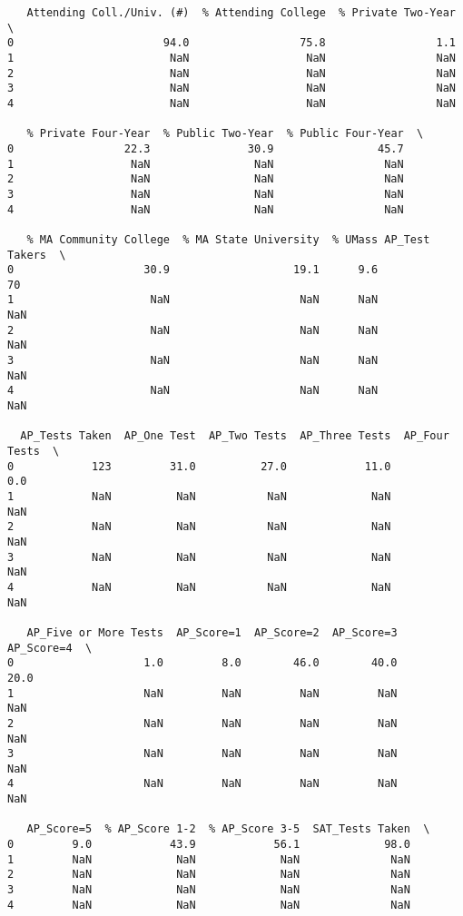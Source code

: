 \documentclass[11pt]{article}
\begin{document}
\begin{verbatim}
   Attending Coll./Univ. (#)  % Attending College  % Private Two-Year  \
0                       94.0                 75.8                 1.1   
1                        NaN                  NaN                 NaN   
2                        NaN                  NaN                 NaN   
3                        NaN                  NaN                 NaN   
4                        NaN                  NaN                 NaN   

   % Private Four-Year  % Public Two-Year  % Public Four-Year  \
0                 22.3               30.9                45.7   
1                  NaN                NaN                 NaN   
2                  NaN                NaN                 NaN   
3                  NaN                NaN                 NaN   
4                  NaN                NaN                 NaN   

   % MA Community College  % MA State University  % UMass AP_Test Takers  \
0                    30.9                   19.1      9.6             70   
1                     NaN                    NaN      NaN            NaN   
2                     NaN                    NaN      NaN            NaN   
3                     NaN                    NaN      NaN            NaN   
4                     NaN                    NaN      NaN            NaN   

  AP_Tests Taken  AP_One Test  AP_Two Tests  AP_Three Tests  AP_Four Tests  \
0            123         31.0          27.0            11.0            0.0   
1            NaN          NaN           NaN             NaN            NaN   
2            NaN          NaN           NaN             NaN            NaN   
3            NaN          NaN           NaN             NaN            NaN   
4            NaN          NaN           NaN             NaN            NaN   

   AP_Five or More Tests  AP_Score=1  AP_Score=2  AP_Score=3  AP_Score=4  \
0                    1.0         8.0        46.0        40.0        20.0   
1                    NaN         NaN         NaN         NaN         NaN   
2                    NaN         NaN         NaN         NaN         NaN   
3                    NaN         NaN         NaN         NaN         NaN   
4                    NaN         NaN         NaN         NaN         NaN   

   AP_Score=5  % AP_Score 1-2  % AP_Score 3-5  SAT_Tests Taken  \
0         9.0            43.9            56.1             98.0   
1         NaN             NaN             NaN              NaN   
2         NaN             NaN             NaN              NaN   
3         NaN             NaN             NaN              NaN   
4         NaN             NaN             NaN              NaN   


\end{verbatim}
\end{document}
